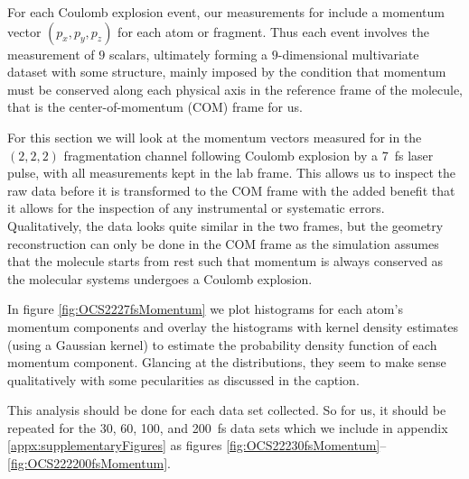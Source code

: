 For each Coulomb explosion event, our measurements for  include a momentum vector $(p_x, p_y, p_z)$ for each atom or fragment. Thus each event involves the measurement of $9$ scalars, ultimately forming a $9$-dimensional multivariate dataset with some structure, mainly imposed by the condition that momentum must be conserved along each physical axis in the reference frame of the molecule, that is the center-of-momentum (COM) frame for us.

For this section we will look at the momentum vectors measured for  in the $(2,2,2)$ fragmentation channel following Coulomb explosion by a \SI{7}{\fs} laser pulse, with all measurements kept in the lab frame. This allows us to inspect the raw data before it is transformed to the COM frame with the added benefit that it allows for the inspection of any instrumental or systematic errors. Qualitatively, the data looks quite similar in the two frames, but the geometry reconstruction can only be done in the COM frame as the simulation assumes that the molecule starts from rest such that momentum is always conserved as the molecular systems undergoes a Coulomb explosion.

In figure \ref{fig:OCS2227fsMomentum} we plot histograms for each atom's momentum components and overlay the histograms with kernel density estimates (using a Gaussian kernel) to estimate the probability density function of each momentum component. Glancing at the distributions, they seem to make sense qualitatively with some pecularities as discussed in the caption. 

This analysis should be done for each data set collected. So for us, it should be repeated for the 30, 60, 100, and \SI{200}{\fs} data sets which we include in appendix \ref{appx:supplementaryFigures} as figures \ref{fig:OCS22230fsMomentum}--\ref{fig:OCS222200fsMomentum}.

